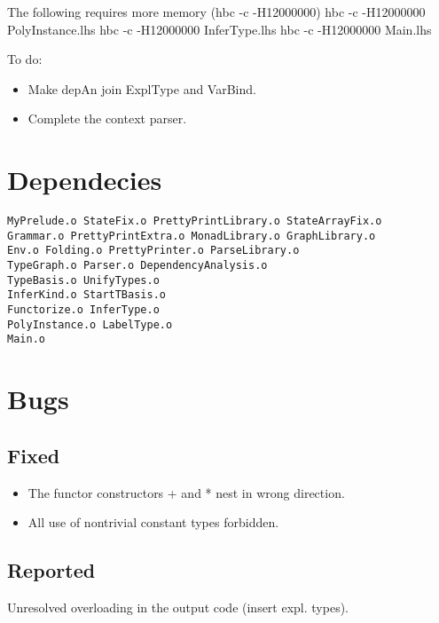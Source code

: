 \documentclass[A4]{article}
\begin{document}
The following requires more memory (hbc -c -H12000000)
hbc -c -H12000000 PolyInstance.lhs
hbc -c -H12000000 InferType.lhs
hbc -c -H12000000 Main.lhs

To do:
\begin{itemize}
\item Make depAn join ExplType and VarBind.
\item Complete the context parser.
\end{itemize}



\section{Dependecies}
\begin{verbatim}
MyPrelude.o StateFix.o PrettyPrintLibrary.o StateArrayFix.o
Grammar.o PrettyPrintExtra.o MonadLibrary.o GraphLibrary.o
Env.o Folding.o PrettyPrinter.o ParseLibrary.o
TypeGraph.o Parser.o DependencyAnalysis.o
TypeBasis.o UnifyTypes.o
InferKind.o StartTBasis.o
Functorize.o InferType.o
PolyInstance.o LabelType.o
Main.o
\end{verbatim}
\section{Bugs}
\subsection{Fixed}
\begin{itemize}
\item The functor constructors + and * nest in wrong direction.
\item All use of nontrivial constant types forbidden.
\end{itemize}
\subsection{Reported}
\item Unresolved overloading in the output code (insert expl. types).
\end{document}
